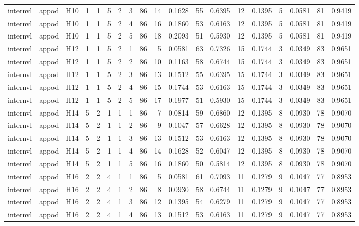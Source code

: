 \begin{longtable}{lllrrrrrrrrrrrrrrrr}
internvl & appod & H10 & 1 & 1 & 5 & 2 & 3 & 86 & 14 & 0.1628 & 55 & 0.6395 & 12 & 0.1395 & 5 & 0.0581 & 81 & 0.9419 \\
internvl & appod & H10 & 1 & 1 & 5 & 2 & 4 & 86 & 16 & 0.1860 & 53 & 0.6163 & 12 & 0.1395 & 5 & 0.0581 & 81 & 0.9419 \\
internvl & appod & H10 & 1 & 1 & 5 & 2 & 5 & 86 & 18 & 0.2093 & 51 & 0.5930 & 12 & 0.1395 & 5 & 0.0581 & 81 & 0.9419 \\
internvl & appod & H12 & 1 & 1 & 5 & 2 & 1 & 86 & 5 & 0.0581 & 63 & 0.7326 & 15 & 0.1744 & 3 & 0.0349 & 83 & 0.9651 \\
internvl & appod & H12 & 1 & 1 & 5 & 2 & 2 & 86 & 10 & 0.1163 & 58 & 0.6744 & 15 & 0.1744 & 3 & 0.0349 & 83 & 0.9651 \\
internvl & appod & H12 & 1 & 1 & 5 & 2 & 3 & 86 & 13 & 0.1512 & 55 & 0.6395 & 15 & 0.1744 & 3 & 0.0349 & 83 & 0.9651 \\
internvl & appod & H12 & 1 & 1 & 5 & 2 & 4 & 86 & 15 & 0.1744 & 53 & 0.6163 & 15 & 0.1744 & 3 & 0.0349 & 83 & 0.9651 \\
internvl & appod & H12 & 1 & 1 & 5 & 2 & 5 & 86 & 17 & 0.1977 & 51 & 0.5930 & 15 & 0.1744 & 3 & 0.0349 & 83 & 0.9651 \\
internvl & appod & H14 & 5 & 2 & 1 & 1 & 1 & 86 & 7 & 0.0814 & 59 & 0.6860 & 12 & 0.1395 & 8 & 0.0930 & 78 & 0.9070 \\
internvl & appod & H14 & 5 & 2 & 1 & 1 & 2 & 86 & 9 & 0.1047 & 57 & 0.6628 & 12 & 0.1395 & 8 & 0.0930 & 78 & 0.9070 \\
internvl & appod & H14 & 5 & 2 & 1 & 1 & 3 & 86 & 13 & 0.1512 & 53 & 0.6163 & 12 & 0.1395 & 8 & 0.0930 & 78 & 0.9070 \\
internvl & appod & H14 & 5 & 2 & 1 & 1 & 4 & 86 & 14 & 0.1628 & 52 & 0.6047 & 12 & 0.1395 & 8 & 0.0930 & 78 & 0.9070 \\
internvl & appod & H14 & 5 & 2 & 1 & 1 & 5 & 86 & 16 & 0.1860 & 50 & 0.5814 & 12 & 0.1395 & 8 & 0.0930 & 78 & 0.9070 \\
internvl & appod & H16 & 2 & 2 & 4 & 1 & 1 & 86 & 5 & 0.0581 & 61 & 0.7093 & 11 & 0.1279 & 9 & 0.1047 & 77 & 0.8953 \\
internvl & appod & H16 & 2 & 2 & 4 & 1 & 2 & 86 & 8 & 0.0930 & 58 & 0.6744 & 11 & 0.1279 & 9 & 0.1047 & 77 & 0.8953 \\
internvl & appod & H16 & 2 & 2 & 4 & 1 & 3 & 86 & 12 & 0.1395 & 54 & 0.6279 & 11 & 0.1279 & 9 & 0.1047 & 77 & 0.8953 \\
internvl & appod & H16 & 2 & 2 & 4 & 1 & 4 & 86 & 13 & 0.1512 & 53 & 0.6163 & 11 & 0.1279 & 9 & 0.1047 & 77 & 0.8953 \\

\end{longtable}
